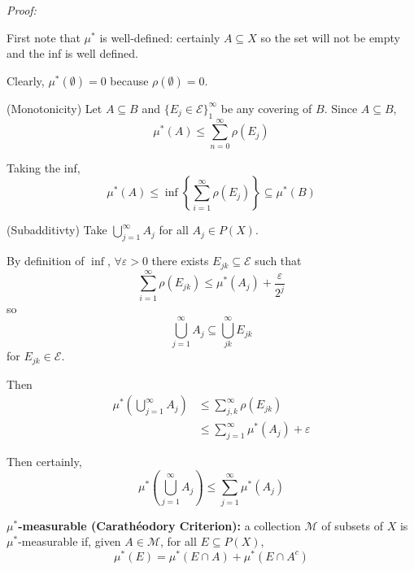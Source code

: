 \documentclass[12pt]{report}
\newcommand{\ep}{\varepsilon}
\newcommand{\Ec}{\mathcal{E}}
\newcommand{\M}{\mathcal{M}}
\newcommand{\sub}{\subseteq}
\newenvironment*{tbox}[2][gray]{
    \begin{tcolorbox}[
        parbox=false,
        colback=#1!5!white,
        colframe=#1!75!black,
        breakable,
        title={#2}
    ]}
    {\end{tcolorbox}}
\begin{document}
        \begin{tbox}{\textbf{Proposition:} Let $\Ec \sub P(X)$ such that $X, \emptyset \in \Ec$. Define $\rho: \Ec \to [0, \infty]$ with $\rho(\emptyset) = 0$. $\forall A \sub P(X)$, let
            \[\mu^*(A) = \inf\left\{\sum_{i=0}^\infty \rho(E_j) \bigg\vert E_j \in \Ec, \; A \sub \bigcup_{j=1}^\infty E_j\right\}\]
            (i.e. take the inf of the sum of all coverings of $A$). Then $\mu^*$ is an outer measure.}
            
            \emph{Proof:}
            
            First note that $\mu^*$ is well-defined: certainly $A \sub X$ so the set will not be empty and the inf is well defined. 

            Clearly, $\mu^*(\emptyset) = 0$ because $\rho(\emptyset) = 0$.

            (Monotonicity) Let $A \sub B$ and $\{E_j \in \Ec\}_1^{\infty}$ be any covering of $B$. Since $A \sub B$, 
            \[\mu^*(A) \leq \sum_{n=0}^\infty \rho(E_j)\]

            Taking the inf, 
            \[\mu^*(A) \leq \inf\left\{\sum_{i=1}^{\infty} \rho(E_j)\right\} \sub \mu^*(B)\]

            (Subadditivty) Take $\bigcup_{j=1}^{\infty} A_j$ for all $A_j \in P(X)$. 

            By definition of $\inf$, $\forall \ep > 0$ there exists $E_{jk} \sub \Ec$ such that  
            \[\sum_{i=1}^{\infty} \rho(E_{jk}) \leq \mu^*(A_j) + \frac{\ep}{2^j}\]
            so 
            \[\bigcup_{j=1}^{\infty} A_j \sub \bigcup_{jk}^{\infty} E_{jk}\]
            for $E_{jk} \in \Ec$. 

            Then 
            \begin{align*}
                \mu^*\left(\bigcup_{j=1}^\infty A_j\right) &\leq \sum_{j, k}^\infty  \rho(E_{jk})\\ 
                    &\leq \sum_{j=1}^{\infty} \mu^*(A_j) + \ep
            \end{align*}

            Then certainly, 
            \[\mu^*\left(\bigcup_{j=1}^\infty A_j\right) \leq \sum_{j=1}^\infty \mu^*(A_j)\]
        \end{tbox}

        \textbf{$\mu^*$-measurable (Carathéodory Criterion):} a collection $\M$ of subsets of $X$ is $\mu^*$-measurable if, given $A \in \M$, for all $E \sub P(X)$,
        \[\mu^*(E) = \mu^*(E \cap A) + \mu^*(E \cap A^c)\]
\end{document}
